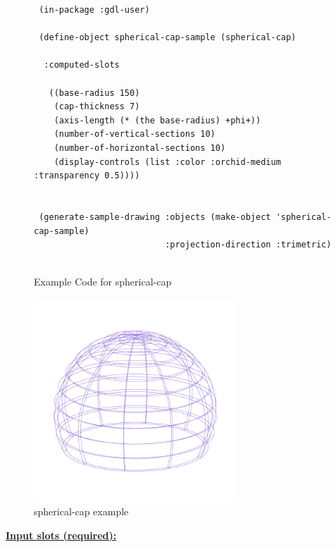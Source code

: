 \documentclass [11pt]{book}
\begin{document}
\begin{itemize}
\begin{figure}
\begin{lrbox}{\boxedverb}
\begin{minipage}{\linewidth}
{\begin{verbatim}
 (in-package :gdl-user)

 (define-object spherical-cap-sample (spherical-cap)
   
  :computed-slots

   ((base-radius 150)
    (cap-thickness 7)
    (axis-length (* (the base-radius) +phi+))
    (number-of-vertical-sections 10)
    (number-of-horizontal-sections 10)
    (display-controls (list :color :orchid-medium :transparency 0.5))))
  

 (generate-sample-drawing :objects (make-object 'spherical-cap-sample) 
                          :projection-direction :trimetric)
                  

\end{verbatim}}
\end{minipage}
\end{lrbox}
\fbox{\usebox{\boxedverb}}

\caption{Example Code for spherical-cap}

\label{fig:example-code-spherical-cap}

\end{figure}

\begin{figure}
\begin{center}
\includegraphics[width=3in,height=3in]{../images/example-spherical-cap.pdf}
\end{center}

\caption{spherical-cap example}

\label{fig:spherical-cap}

\end{figure}





\textbf{
\underline{Input slots (required):}}

\begin{description}


\end{description}
\end{itemize}
\end{document}
